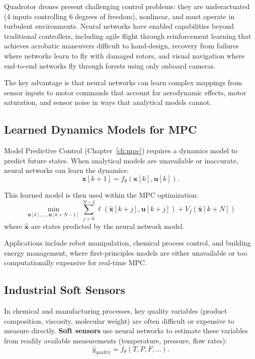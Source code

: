 Quadrotor drones present challenging control problems: they are underactuated (4 inputs controlling 6 degrees of freedom), nonlinear, and must operate in turbulent environments. Neural networks have enabled capabilities beyond traditional controllers, including agile flight through reinforcement learning that achieves acrobatic maneuvers difficult to hand-design, recovery from failures where networks learn to fly with damaged rotors, and visual navigation where end-to-end networks fly through forests using only onboard cameras.

The key advantage is that neural networks can learn complex mappings from sensor inputs to motor commands that account for aerodynamic effects, motor saturation, and sensor noise in ways that analytical models cannot.

\subsection{Learned Dynamics Models for MPC}

Model Predictive Control (Chapter~\ref{ch:mpc}) requires a dynamics model to predict future states. When analytical models are unavailable or inaccurate, neural networks can learn the dynamics:
\begin{equation}
\mathbf{x}[k+1] = f_{\theta}(\mathbf{x}[k], \mathbf{u}[k]).
\end{equation}

This learned model is then used within the MPC optimization:
\begin{equation}
\min_{\mathbf{u}[k], \ldots, \mathbf{u}[k+N-1]} \sum_{j=0}^{N-1} \ell(\hat{\mathbf{x}}[k+j], \mathbf{u}[k+j]) + V_f(\hat{\mathbf{x}}[k+N])
\end{equation}
where $\hat{\mathbf{x}}$ are states predicted by the neural network model.

Applications include robot manipulation, chemical process control, and building energy management, where first-principles models are either unavailable or too computationally expensive for real-time MPC.

\subsection{Industrial Soft Sensors}

In chemical and manufacturing processes, key quality variables (product composition, viscosity, molecular weight) are often difficult or expensive to measure directly. \textbf{Soft sensors} use neural networks to estimate these variables from readily available measurements (temperature, pressure, flow rates):
\begin{equation}
\hat{y}_{\text{quality}} = f_{\theta}(T, P, F, \ldots).
\end{equation}

